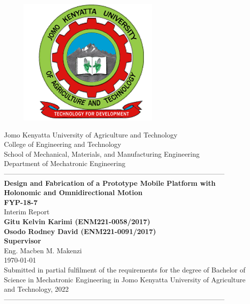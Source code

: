 \documentclass[12pt,fleqn]{report}
\begin{document}
\begin{titlepage}
  \begin{center}
      \vspace*{-4.0cm}
    \begin{figure}[!h]
\centering
\includegraphics[width=0.3\linewidth]{Figures/JKUAT_logo}
\label{fig:jomologo}
\end{figure}
   \large{Jomo Kenyatta University of Agriculture and Technology}\\
    \large{College of Engineering and Technology}\\
    \large{School of Mechanical, Materials, and Manufacturing Engineering}\\
   \large{Department of Mechatronic Engineering}\\
    ------------------------------------------------------------------------------------------------\\
    \LARGE{\textbf{Design and Fabrication of a Prototype Mobile Platform with Holonomic and Omnidirectional Motion}}\\[0.5cm]
    \LARGE{\textbf{FYP-18-7}}\\[0.1cm]
    \LARGE{Interim Report}\\[0.1cm]
    \vspace{0.1cm}
    \large{\textbf{Gitu Kelvin Karimi (ENM221-0058/2017)}}\\
    \large{\textbf{Osodo Rodney David (ENM221-0091/2017)}}\\[0.3cm]
    \large{\textbf{Supervisor}}\\
    \large{Eng. Macben M. Makenzi}\\[0.2cm]
    \large{\small{\monthyeardate\today}}\\
    \large{\small{Submitted in partial fulfilment of the requirements for the degree of Bachelor of Science in Mechatronic Engineering in Jomo Kenyatta University of Agriculture and Technology, 2022}}
    ------------------------------------------------------------------------------------------------\\[1.0cm]
  \end{center}
\end{titlepage}
%

\clearpage
\newpage
{}

\clearpage
{}
\tableofcontents
\clearpage
{}
\let\oldnumberline\numberline%
\renewcommand{\numberline}{\figurename~\oldnumberline}%
\listoffigures
\clearpage
{}
\listoftables
\newpage
\clearpage
{}

\clearpage
\newpage
\end{document}
